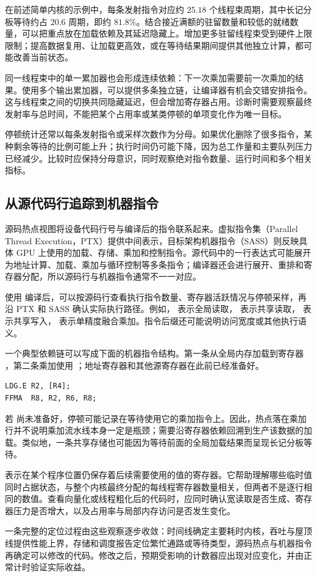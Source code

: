 在前述简单内核的示例中，每条发射指令对应约 $25.18$ 个线程束周期，其中长记分板等待约占 $20.6$ 周期，即约 $81.8\%$。结合接近满额的驻留数量和较低的就绪数量，可以把重点放在加载依赖及其延迟隐藏上。增加更多驻留线程束受到硬件上限限制；提高数据复用、让加载更高效，或在等待结果期间提供其他独立计算，都可能改善当前状态。

同一线程束中的单一累加器也会形成连续依赖：下一次乘加需要前一次乘加的结果。使用多个输出累加器，可以提供多条独立链，让编译器有机会交错安排指令。这与线程束之间的切换共同隐藏延迟，但会增加寄存器占用。诊断时需要观察最终发射率与总时间，不能把某个占用率或某类停顿的单项变化作为唯一目标。

停顿统计还常以每条发射指令或采样次数作为分母。如果优化删除了很多指令，某种剩余等待的比例可能上升；执行时间仍可能下降，因为总工作量和主要队列压力已经减少。比较时应保持分母意识，同时观察绝对指令数量、运行时间和多个相关指标。

\subsection{从源代码行追踪到机器指令}

源码热点视图将设备代码行号与编译后的指令联系起来。虚拟指令集（Parallel Thread Execution，PTX）提供中间表示，目标架构机器指令（SASS）则反映具体 GPU 上使用的加载、存储、乘加和控制指令。源代码中的一行表达式可能展开为地址计算、加载、乘加与循环控制等多条指令；编译器还会进行展开、重排和寄存器分配，所以源码行与机器指令通常不一一对应。

使用  编译后，可以按源码行查看执行指令数量、寄存器活跃情况与停顿采样，再沿 PTX 和 SASS 确认实际执行路径。例如， 表示全局读取， 表示共享读取， 表示共享写入， 表示单精度融合乘加。指令后缀还可能说明访问宽度或其他执行语义。

一个典型依赖链可以写成下面的机器指令结构。第一条从全局内存加载到寄存器 ，第二条乘加使用 ；地址寄存器和其他源寄存器在此前已经准备好。

\noindent\begin{minipage}{\linewidth}
\begin{lstlisting}[language={},caption={加载结果到消费指令的依赖示意}]
LDG.E R2, [R4];
FFMA  R8, R2, R6, R8;
\end{lstlisting}
\end{minipage}

若  尚未准备好，停顿可能记录在等待使用它的乘加指令上。因此，热点落在乘加行并不说明乘加流水线本身一定是瓶颈；需要沿寄存器依赖回溯到生产该数据的加载。类似地，一条共享存储也可能因为等待前面的全局加载结果而呈现长记分板等待。

表示在某个程序位置仍保存着后续需要使用的值的寄存器。它帮助理解哪些临时值同时占据状态，与整个内核最终分配的每线程寄存器数量相关，但两者不是逐行相同的数值。查看向量化或线程粗化后的代码时，应同时确认宽读取是否生成、寄存器压力是否增大，以及占用率与局部内存访问是否发生变化。

一条完整的定位过程由这些观察逐步收敛：时间线确定主要耗时内核，吞吐与屋顶线提供性能上界，存储和调度报告定位繁忙通路或等待类型，源码热点与机器指令再确定可以修改的代码。修改之后，预期受影响的计数器应出现对应变化，并由正常计时验证实际收益。

